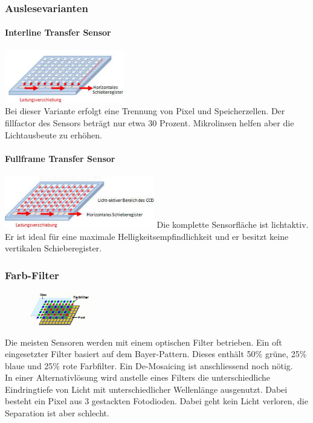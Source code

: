 \subsubsection{Auslesevarianten}
\begin{multicols}{2}
    \paragraph{Interline Transfer Sensor}
    \includegraphics[width=0.39\textwidth]{images/ccd_interline} \\
    Bei dieser Variante erfolgt eine Trennung von Pixel und Speicherzellen. Der fillfactor des Sensors beträgt nur etwa 30 Prozent. Mikrolinsen helfen aber die Lichtausbeute zu erhöhen.
    
    \paragraph{Fullframe Transfer Sensor}
    \includegraphics[width=0.49\textwidth]{images/ccd_fullframe}
    Die komplette Sensorfläche ist lichtaktiv. Er ist ideal für eine maximale Helligkeitsempfindlichkeit und er besitzt keine vertikalen Schieberegister. 
\end{multicols}

\subsubsection{Farb-Filter}
\begin{figure}
    \vspace{-12pt}
    \centering
    \includegraphics[width=0.24\textwidth]{images/ccd_filter}
\end{figure}
Die meisten Sensoren werden mit einem optischen Filter betrieben. Ein oft eingesetzter Filter basiert auf dem Bayer-Pattern. Dieses enthält 50\% grüne, 25\% blaue und 25\% rote Farbfilter. Ein De-Mosaicing ist anschliessend noch nötig. \\
In einer Alternativlösung wird anstelle eines Filters die unterschiedliche Eindringtiefe von Licht mit unterschiedlicher Wellenlänge ausgenutzt. Dabei besteht ein Pixel aus 3 gestackten Fotodioden. Dabei geht kein Licht verloren, die Separation ist aber schlecht.


